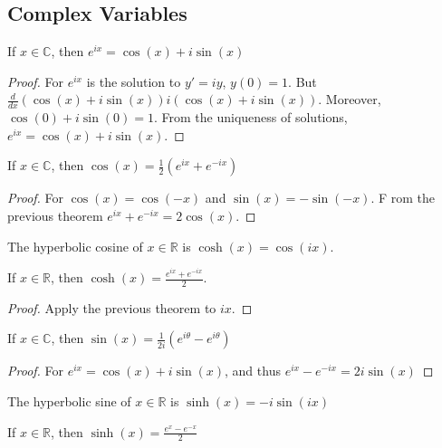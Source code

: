        \subsection{Complex Variables}
            \begin{theorem}
            If $x\in\mathbb{C}$, then $e^{ix}=\cos(x)+i\sin(x)$
            \end{theorem}
            \begin{proof}
            For $e^{ix}$ is the solution to $y'=iy$, $y(0)=1$. But $\frac{d}{dx}(\cos(x)+i\sin(x))i(\cos(x)+i\sin(x))$. Moreover, $\cos(0)+i\sin(0)=1$. From the uniqueness of solutions, $e^{ix}=\cos(x)+i\sin(x)$. 
            \end{proof}
            \begin{theorem}
            If $x\in \mathbb{C}$, then $\cos(x)=\frac{1}{2}(e^{ix}+e^{-ix})$
            \end{theorem}
            \begin{proof}
            For $\cos(x)=\cos(-x)$ and $\sin(x)=-\sin(-x)$. F rom the previous theorem $e^{ix}+e^{-ix} = 2\cos(x)$.
            \end{proof}
            \begin{definition}
            The hyperbolic cosine of $x\in \mathbb{R}$ is $\cosh(x)=\cos(ix)$.
            \end{definition}
            \begin{theorem}
            If $x\in\mathbb{R}$, then $\cosh(x)=\frac{e^{ix}+e^{-ix}}{2}$.
            \end{theorem}
            \begin{proof}
            Apply the previous theorem to $ix$.
            \end{proof}
            \begin{theorem}
            If $x\in\mathbb{C}$, then $\sin(x)=\frac{1}{2i}(e^{i\theta}-e^{i\theta})$
            \end{theorem}
            \begin{proof}
            For $e^{ix} = \cos(x)+i\sin(x)$, and thus $e^{ix}-e^{-ix}=2i\sin(x)$
            \end{proof}
            \begin{definition}
            The hyperbolic sine of $x\in\mathbb{R}$ is $\sinh(x)=-i\sin(ix)$
            \end{definition}
            \begin{theorem}
            If $x\in\mathbb{R}$, then $\sinh(x)=\frac{e^{x}-e^{-x}}{2}$
            \end{theorem}
